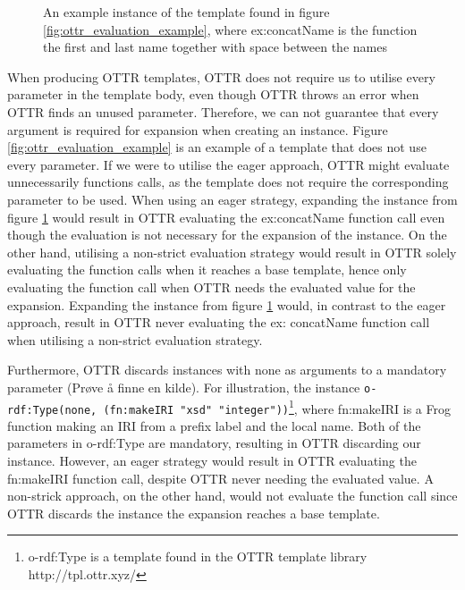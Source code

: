 \begin{figure}
    
    \caption{An example instance of the template found in figure \ref{fig:ottr_evaluation_example},  where ex:concatName is the function the first and last name together with space between the names}
    \label{fig:ottr_evaluation_example_usage}
\end{figure}
\para
When producing OTTR templates, OTTR does not require us to utilise every parameter in the template body, even though OTTR throws an error when OTTR finds an unused parameter. Therefore, we can not guarantee that every argument is required for expansion when creating an instance. 
Figure \ref{fig:ottr_evaluation_example} is an example of a template that does not use every parameter. If we were to utilise the eager approach, OTTR might evaluate unnecessarily functions calls, as the template does not require the corresponding parameter to be used. When using an eager strategy, expanding the instance from figure \ref{fig:ottr_evaluation_example_usage} would result in OTTR evaluating the ex:concatName function call even though the evaluation is not necessary for the expansion of the instance. On the other hand, utilising a non-strict evaluation strategy would result in OTTR solely evaluating the function calls when it reaches a base template, hence only evaluating the function call when OTTR needs the evaluated value for the expansion. Expanding the instance from figure \ref{fig:ottr_evaluation_example_usage} would, in contrast to the eager approach, result in OTTR never evaluating the ex: concatName function call when utilising a non-strict evaluation strategy. 

\para 
Furthermore, OTTR discards instances with none as arguments to a mandatory parameter (Prøve å finne en kilde). For illustration, the instance \lstinline{o-rdf:Type(none, (fn:makeIRI "xsd" "integer"))}\footnote{o-rdf:Type is a template found in the OTTR template library http://tpl.ottr.xyz/}, where fn:makeIRI is a Frog function making an IRI from a prefix label and the local name. Both of the parameters in o-rdf:Type are mandatory, resulting in OTTR discarding our instance. However, an eager strategy would result in OTTR evaluating the fn:makeIRI function call, despite OTTR never needing the evaluated value. A non-strick approach, on the other hand, would not evaluate the function call since OTTR discards the instance the expansion reaches a base template.

